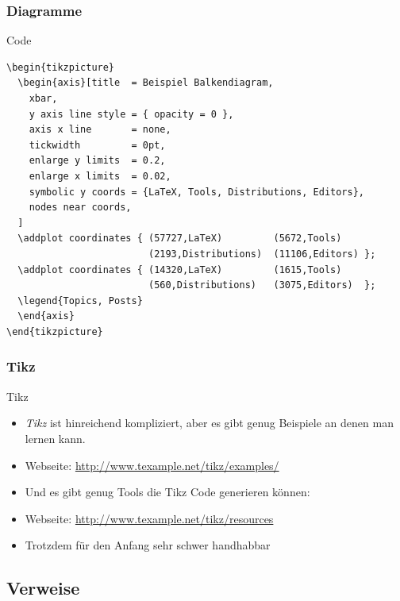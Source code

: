 \begin{frame}[fragile]
  \frametitle{Diagramme}

  \begin{block}{Code}
    \begin{verbatim}
\begin{tikzpicture}
  \begin{axis}[title  = Beispiel Balkendiagram,
    xbar,
    y axis line style = { opacity = 0 },
    axis x line       = none,
    tickwidth         = 0pt,
    enlarge y limits  = 0.2,
    enlarge x limits  = 0.02,
    symbolic y coords = {LaTeX, Tools, Distributions, Editors},
    nodes near coords,
  ]
  \addplot coordinates { (57727,LaTeX)         (5672,Tools)
                         (2193,Distributions)  (11106,Editors) };
  \addplot coordinates { (14320,LaTeX)         (1615,Tools)
                         (560,Distributions)   (3075,Editors)  };
  \legend{Topics, Posts}
  \end{axis}
\end{tikzpicture}
    \end{verbatim}
  \end{block}
\end{frame}

\begin{frame}[fragile]
  \frametitle{Tikz}

  \begin{block}{Tikz}
    \begin{itemize}[<+->]
      \item \textit{Tikz} ist hinreichend kompliziert, aber es gibt genug Beispiele an denen man lernen kann.
      \item Webseite: \url{http://www.texample.net/tikz/examples/}
      \item Und es gibt genug Tools die Tikz Code generieren können:
      \item Webseite: \url{http://www.texample.net/tikz/resources}
      \item Trotzdem für den Anfang sehr schwer handhabbar
    \end{itemize}
  \end{block}
\end{frame}


\subsection{Verweise}

